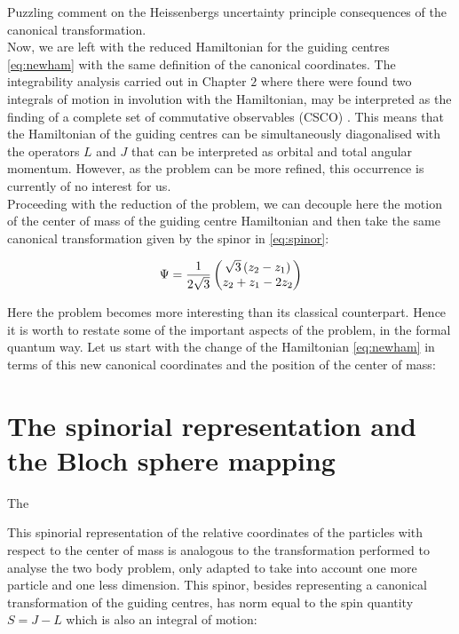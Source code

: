 Puzzling comment on the Heissenbergs uncertainty principle consequences of the canonical transformation.\\

Now, we are left with the reduced Hamiltonian for the guiding centres \eqref{eq:newham} with the same definition of the canonical coordinates. The integrability analysis carried out in Chapter $2$ where there were found two integrals of motion in involution with the Hamiltonian, may be interpreted as the finding of a complete set of commutative observables (CSCO) \cite{csco}. This means that the Hamiltonian of the guiding centres can be simultaneously diagonalised with the operators $L$ and $J$ that can be interpreted as orbital and total angular momentum. However, as the problem can be more refined, this occurrence is currently of no interest for us.\\

Proceeding with the reduction of the problem, we can decouple here the motion of the center of mass of the guiding centre Hamiltonian and then take the same canonical transformation given by the spinor in \eqref{eq:spinor}:

\begin{align}
\Psi = \frac{1}{2\sqrt{3}}\begin{pmatrix}\sqrt{3}\left( z_{2}-z_{1} \right)\\
z_{2}+z_{1}-2z_{2}\end{pmatrix}
\label{eq:spinor2}
\end{align}

Here the problem becomes more interesting than its classical counterpart. Hence it is worth to restate some of the important aspects of the problem, in the formal quantum way. Let us start with the change of the Hamiltonian \ref{eq:newham} in terms of this new canonical coordinates and the position of the center of mass:\\

\section{The spinorial representation and the Bloch sphere mapping}
The

This spinorial representation of the relative coordinates of the particles with respect to the center of mass is analogous to the transformation performed to analyse the two body problem, only adapted to take into account one more particle and one less dimension. This spinor, besides representing a canonical transformation of the guiding centres, has norm equal to the spin quantity $S = J-L$ which is also an integral of motion:

